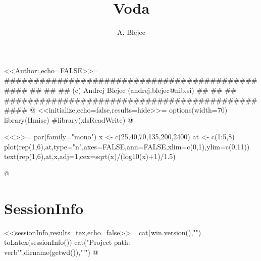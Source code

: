\documentclass[a4paper,12pt]{article}
\begin{document}
\title{Voda}
\author{A. Blejec}
%

\maketitle
\tableofcontents
<<Author:,echo=FALSE>>=
###############################################
##                                           ##
## (c) Andrej Blejec (andrej.blejec@nib.si)  ##
##                                           ##
###############################################
@
<<initialize,echo=false,results=hide>>=
options(width=70)
library(Hmisc)
#library(xlsReadWrite)
@

<<>>=
par(family="mono")
x <- c(25,40,70,135,200,2400)
at <- c(1:5,8)
plot(rep(1,6),at,type="n",axes=FALSE,ann=FALSE,xlim=c(0,1),ylim=c(0,11))
text(rep(1,6),at,x,adj=1,cex=sqrt(x)/(log10(x)+1)/1.5)

@


%
%

%

\clearpage
\section*{SessionInfo}
{\small
<<sessionInfo,results=tex,echo=false>>=
cat(win.version(),"\n")
toLatex(sessionInfo())
cat("Project path:\\verb'",dirname(getwd()),"'\n")
@
}
\end{document}
